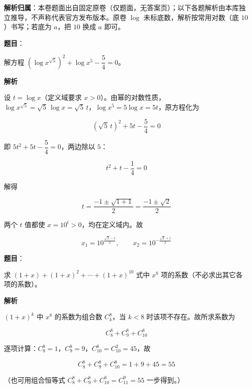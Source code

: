 

\begin{gknotice}
\textbf{解析归属}：本卷题面出自固定原卷（仅题面，无答案页）；以下各题解析由本库独立推导，不声称代表官方发布版本。原卷 $\log$ 未标底数，解析按常用对数（底 $10$）书写；若底为 $a$，把 $10$ 换成 $a$ 即可。
\end{gknotice}

\begin{answer}

\textbf{题目}：

解方程 $\left(\log x^{\sqrt5}\right)^2+\log x^5-\dfrac54=0$。

\textbf{解析}

设 $t=\log x$（定义域要求 $x>0$）。由幂的对数性质，$\log x^{\sqrt5}=\sqrt5\,\log x=\sqrt5\,t$，$\log x^5=5\log x=5t$，原方程化为

\nopagebreak[4]
\[
\left(\sqrt5\,t\right)^2+5t-\frac54=0
\]

即 $5t^2+5t-\dfrac54=0$，两边除以 $5$：

\nopagebreak[4]
\[
t^2+t-\frac14=0
\]

解得

\nopagebreak[4]
\[
t=\frac{-1\pm\sqrt{1+1}}{2}=\frac{-1\pm\sqrt2}{2}
\]

两个 $t$ 值都使 $x=10^t>0$，均在定义域内。故

\nopagebreak[4]
\[
x_1=10^{\frac{\sqrt2-1}{2}},\qquad x_2=10^{-\frac{\sqrt2+1}{2}}
\]


\end{answer}
\begin{answer}

\textbf{题目}：

求 $(1+x)+(1+x)^2+\cdots+(1+x)^{10}$ 式中 $x^8$ 项的系数（不必求出其它各项的系数）。

\textbf{解析}

$(1+x)^k$ 中 $x^8$ 的系数为组合数 $C_k^8$，当 $k<8$ 时该项不存在。故所求系数为

\nopagebreak[4]
\[
C_8^8+C_9^8+C_{10}^8
\]

逐项计算：$C_8^8=1$，$C_9^8=9$，$C_{10}^8=C_{10}^2=45$，故

\nopagebreak[4]
\[
C_8^8+C_9^8+C_{10}^8=1+9+45=55
\]

（也可用组合恒等式 $C_8^8+C_9^8+C_{10}^8=C_{11}^9=55$ 一步得到。）


\end{answer}
